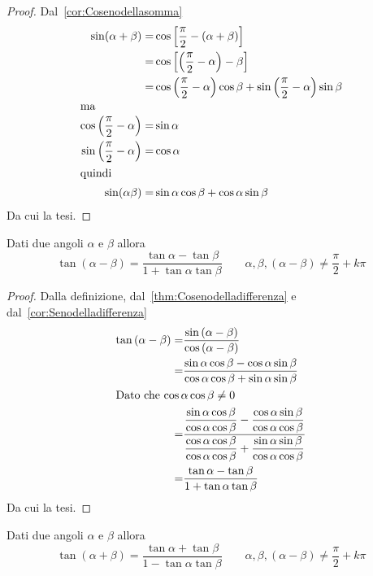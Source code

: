 \begin{proof}
	Dal~\vref{cor:Cosenodellasomma}
	\begin{align*}
	\sin(\alpha+\beta)=&\cos\left[\dfrac{\pi}{2}-\left(\alpha+\beta\right)\right]\\
	=&\cos\left[\left(\dfrac{\pi}{2}-\alpha\right)-\beta\right]\\
	=&\cos\left(\dfrac{\pi}{2}-\alpha\right)\cos\beta+\sin\left(\dfrac{\pi}{2}-\alpha\right)\sin\beta\\
	\intertext{ma}
	\cos\left(\dfrac{\pi}{2}-\alpha\right)=&\sin\alpha\\
	\sin\left(\dfrac{\pi}{2}-\alpha\right)=&\cos\alpha\\
	\intertext{quindi}
	\sin(\alpha\beta)=&\sin\alpha\cos\beta+\cos\alpha\sin\beta\\
	\end{align*}
	Da cui la tesi.
\end{proof}
\begin{thm}\label{thm:tangentedifferenza}
Dati due angoli $\alpha$ e $\beta$ allora\[\tan\left(\alpha-\beta\right)=\dfrac{\tan\alpha-\tan\beta}{1+\tan\alpha\tan\beta}\qquad\alpha,\beta,(\alpha-\beta)\neq\dfrac{\pi}{2}+k\pi\]
\end{thm}
\begin{proof}
	Dalla definizione, dal~\vref{thm:Cosenodelladifferenza} e dal~\vref{cor:Senodelladifferenza}
	\begin{align*}
	\tan\left(\alpha-\beta\right)=&\dfrac{\sin\left(\alpha-\beta\right)}{\cos\left(\alpha-\beta\right)}\\
	=&\dfrac{\sin\alpha\cos\beta-\cos\alpha\sin\beta}{\cos\alpha\cos\beta+\sin\alpha\sin\beta}\\
	\intertext{Dato che $\cos\alpha\cos\beta\neq 0$}
	=&\dfrac{\dfrac{\sin\alpha\cos\beta}{\cos\alpha\cos\beta}-\dfrac{\cos\alpha\sin\beta}{\cos\alpha\cos\beta}}{\dfrac{\cos\alpha\cos\beta}{\cos\alpha\cos\beta}+\dfrac{\sin\alpha\sin\beta}{\cos\alpha\cos\beta}}\\
	=&\dfrac{\tan\alpha-\tan\beta}{1+\tan\alpha\tan\beta}\\
	\end{align*}
	Da cui la tesi.
\end{proof}
\begin{cor}\label{cor:Tangentesommadiangoli}
	Dati due angoli $\alpha$ e $\beta$ allora\[\tan\left(\alpha+\beta\right)=\dfrac{\tan\alpha+\tan\beta}{1-\tan\alpha\tan\beta}\qquad\alpha,\beta,(\alpha-\beta)\neq\dfrac{\pi}{2}+k\pi\]
\end{cor}
